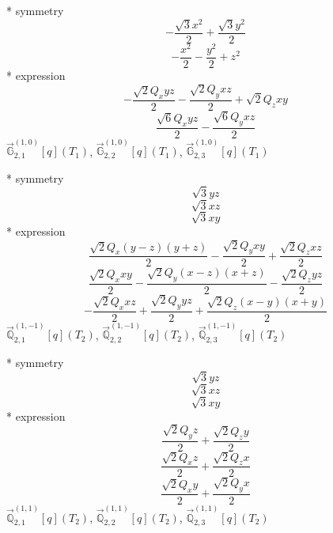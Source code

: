 \documentclass[fleqn,8pt]{jsarticle}
\begin{document}
\noindent\quad ** symmetry
\begin{dmath*}
- \frac{\sqrt{3} x^{2}}{2} + \frac{\sqrt{3} y^{2}}{2}
\end{dmath*}
\begin{dmath*}
- \frac{x^{2}}{2} - \frac{y^{2}}{2} + z^{2}
\end{dmath*}
\noindent\quad ** expression
\begin{dmath*}
- \frac{\sqrt{2} Q_{x} y z}{2} - \frac{\sqrt{2} Q_{y} x z}{2} + \sqrt{2} Q_{z} x y
\end{dmath*}
\begin{dmath*}
\frac{\sqrt{6} Q_{x} y z}{2} - \frac{\sqrt{6} Q_{y} x z}{2}
\end{dmath*}
\noindent\quad $\vec{\mathbb{G}}_{2,1}^{(1,0)}[q](T_{1})$, $\vec{\mathbb{G}}_{2,2}^{(1,0)}[q](T_{1})$, $\vec{\mathbb{G}}_{2,3}^{(1,0)}[q](T_{1})$

\noindent\quad ** symmetry
\begin{dmath*}
\sqrt{3} y z
\end{dmath*}
\begin{dmath*}
\sqrt{3} x z
\end{dmath*}
\begin{dmath*}
\sqrt{3} x y
\end{dmath*}
\noindent\quad ** expression
\begin{dmath*}
\frac{\sqrt{2} Q_{x} \left(y - z\right) \left(y + z\right)}{2} - \frac{\sqrt{2} Q_{y} x y}{2} + \frac{\sqrt{2} Q_{z} x z}{2}
\end{dmath*}
\begin{dmath*}
\frac{\sqrt{2} Q_{x} x y}{2} - \frac{\sqrt{2} Q_{y} \left(x - z\right) \left(x + z\right)}{2} - \frac{\sqrt{2} Q_{z} y z}{2}
\end{dmath*}
\begin{dmath*}
- \frac{\sqrt{2} Q_{x} x z}{2} + \frac{\sqrt{2} Q_{y} y z}{2} + \frac{\sqrt{2} Q_{z} \left(x - y\right) \left(x + y\right)}{2}
\end{dmath*}
\noindent\quad $\vec{\mathbb{Q}}_{2,1}^{(1,-1)}[q](T_{2})$, $\vec{\mathbb{Q}}_{2,2}^{(1,-1)}[q](T_{2})$, $\vec{\mathbb{Q}}_{2,3}^{(1,-1)}[q](T_{2})$

\noindent\quad ** symmetry
\begin{dmath*}
\sqrt{3} y z
\end{dmath*}
\begin{dmath*}
\sqrt{3} x z
\end{dmath*}
\begin{dmath*}
\sqrt{3} x y
\end{dmath*}
\noindent\quad ** expression
\begin{dmath*}
\frac{\sqrt{2} Q_{y} z}{2} + \frac{\sqrt{2} Q_{z} y}{2}
\end{dmath*}
\begin{dmath*}
\frac{\sqrt{2} Q_{x} z}{2} + \frac{\sqrt{2} Q_{z} x}{2}
\end{dmath*}
\begin{dmath*}
\frac{\sqrt{2} Q_{x} y}{2} + \frac{\sqrt{2} Q_{y} x}{2}
\end{dmath*}
\noindent\quad $\vec{\mathbb{Q}}_{2,1}^{(1,1)}[q](T_{2})$, $\vec{\mathbb{Q}}_{2,2}^{(1,1)}[q](T_{2})$, $\vec{\mathbb{Q}}_{2,3}^{(1,1)}[q](T_{2})$
\end{document}
